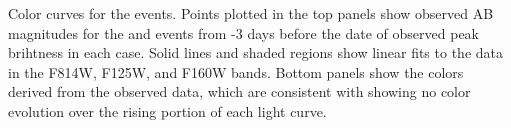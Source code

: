 Color curves for the \spock events.   Points plotted in the top panels show observed AB magnitudes for the \spockone and \spocktwo events from -3 days before the date of observed peak brihtness in each case.  Solid lines and shaded regions show linear fits to the data in the F814W, F125W, and F160W bands.  Bottom panels show the colors derived from the observed data, which are consistent with showing no color evolution over the rising portion of each light curve. 
\label{fig:ColorCurves}